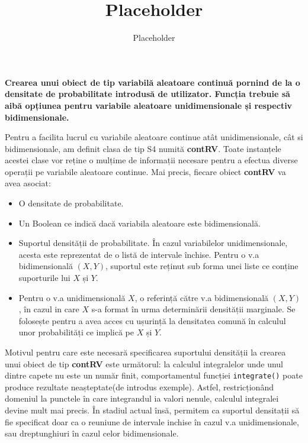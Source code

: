 \documentclass[12pt]{article}
\title{Placeholder}
\author{Placeholder}
\begin{document}
	\textbf{Crearea unui obiect de tip variabilă aleatoare continuă pornind de la o densitate de
		probabilitate introdusă de utilizator. Funcția trebuie să aibă opțiunea pentru variabile
		aleatoare unidimensionale și respectiv bidimensionale.}\vspace{5mm}
	
	Pentru a facilita lucrul cu variabile aleatoare continue atât unidimensionale, cât si bidimensionale, am definit clasa de tip S4 numită \textbf{contRV}. Toate instanțele acestei clase vor reține o mulțime de informații necesare pentru a efectua diverse operații pe variabile aleatoare continue. Mai precis, fiecare obiect \textbf{contRV} va avea 
	asociat:
	\begin{itemize}
		\item O densitate de probabilitate.
		\item Un Boolean ce indică dacă variabila aleatoare este bidimensională.
		\item Suportul densității de probabilitate. În cazul variabilelor unidimensionale, acesta este reprezentat de o listă de intervale închise. Pentru o v.a bidimensională $(X, Y)$, suportul este reținut sub forma unei liste ce conține suporturile lui $X$ și $Y$.
		\item Pentru o v.a unidimensională $X$, o referință către v.a bidimensională $(X, Y)$, în cazul in care $X$ s-a format în urma determinării densității marginale. Se folosește pentru a avea acces cu ușurință la densitatea comună în calculul unor probabilități ce implică pe $X$ și $Y$.
	\end{itemize}\vspace*{1\baselineskip} \par
	Motivul pentru care este necesară specificarea suportului densității la crearea unui obiect de tip \textbf{contRV} este următorul: la calculul integralelor unde unul dintre capete nu este un număr finit, comportamentul funcției \lstinline|integrate()| poate produce rezultate neașteptate(de introdus exemple). Astfel, restricționând domeniul la punctele în care integrandul ia valori nenule, calculul integralei devine mult mai precis.
	În stadiul actual însă, permitem ca suportul densitații să fie specificat doar ca o reuniune de intervale inchise în cazul v.a unidimensionale, sau dreptunghiuri în cazul celor bidimensionale.\vspace*{1\baselineskip}\par
	
\end{document}
